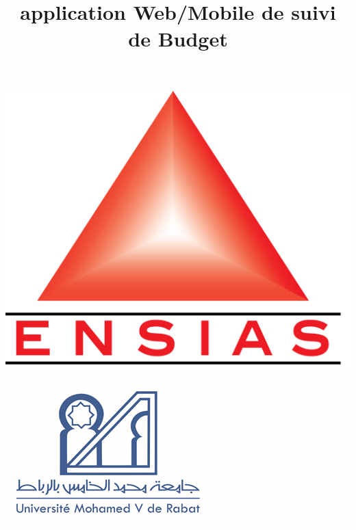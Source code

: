 \documentclass[12pt,twoside]{report}
\title{application Web/Mobile de suivi de Budget }
\begin{document}
\begin{titlepage}
    \begin{minipage}[t]{0.2\textwidth}    %
        \includegraphics[width=\linewidth]{ensias.png}
    \end{minipage}%
  \begin{minipage}[t][2cm]{0.6\textwidth}
    \centering\bfseries\large
    \hfill
  \end{minipage}%
    \begin{minipage}[t]{0.2\textwidth}
    \includegraphics[width=\linewidth]{um5.png}
  \end{minipage}
  \begin{center}
  \vspace{0.2cm}

\end{center}
\end{titlepage}
\end{document}
